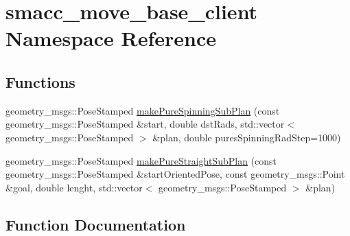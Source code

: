 \hypertarget{namespacesmacc__move__base__client}{}\section{smacc\+\_\+move\+\_\+base\+\_\+client Namespace Reference}
\label{namespacesmacc__move__base__client}
\subsection*{Functions}
\begin{DoxyCompactItemize}
\item 
geometry\+\_\+msgs\+::\+Pose\+Stamped \hyperlink{namespacesmacc__move__base__client_aa30beab025bcffa7f321d40dbb5e8970}{make\+Pure\+Spinning\+Sub\+Plan} (const geometry\+\_\+msgs\+::\+Pose\+Stamped \&start, double dst\+Rads, std\+::vector$<$ geometry\+\_\+msgs\+::\+Pose\+Stamped $>$ \&plan, double pures\+Spinning\+Rad\+Step=1000)
\item 
geometry\+\_\+msgs\+::\+Pose\+Stamped \hyperlink{namespacesmacc__move__base__client_a75b92d6b95689fb8f73cdca23291fdb9}{make\+Pure\+Straight\+Sub\+Plan} (const geometry\+\_\+msgs\+::\+Pose\+Stamped \&start\+Oriented\+Pose, const geometry\+\_\+msgs\+::\+Point \&goal, double lenght, std\+::vector$<$ geometry\+\_\+msgs\+::\+Pose\+Stamped $>$ \&plan)
\end{DoxyCompactItemize}


\subsection{Function Documentation}
